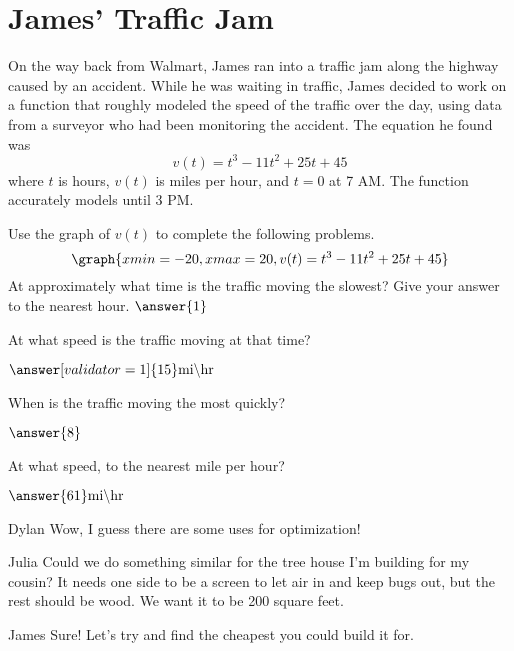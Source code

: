 \documentclass{ximera}
\begin{document}
\section{James' Traffic Jam}
On the way back from Walmart, James ran into a traffic jam along the highway caused by an accident. While he was waiting in traffic, James decided to work on a function that roughly modeled the speed of the traffic over the day, using data from a surveyor who had been monitoring the accident. The equation he found was $$v(t)=t^3-11t^2+25t+45$$ where $t$ is hours, $v(t)$ is miles per hour, and $t = 0$ at 7 AM. The function accurately models until 3 PM.
\begin{question}
Use the graph of $v(t)$ to complete the following problems.
\[
\graph{xmin=-20,xmax=20,v(t)=t^3-11t^2+25t+45}
\]
At approximately what time is the traffic moving the slowest? Give your answer to the nearest hour.
$\answer{1}$
\begin{multipleChoice}
\end{multipleChoice}

At what speed is the traffic moving at that time?

$\answer[validator=1]{15} \text{mi} \backslash \text{hr}$

When is the traffic moving the most quickly?

$\answer{8}$\begin{multipleChoice}
\end{multipleChoice}

At what speed, to the nearest mile per hour?

$\answer{61} \text{mi} \backslash \text{hr}$

\end{question}
\begin{dialogue}
\item[Dylan] Wow, I guess there are some uses for optimization!
\item[Julia] Could we do something similar for the tree house I'm building for my cousin? It needs one side to be a screen to let air in and keep bugs out, but the rest should be wood. We want it to be 200 square feet.
\item[James] Sure! Let's try and find the cheapest you could build it for.
\end{dialogue}
\end{document}
